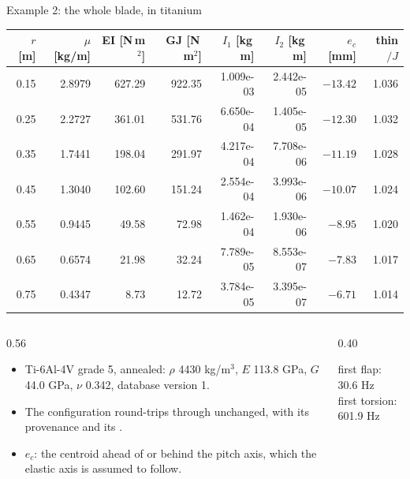 \begin{frame}{Example 2: the whole blade, in titanium}
\relax %
{\ftstablesize\renewcommand{\arraystretch}{1.1}
\begin{tabular*}{\linewidth}{@{\extracolsep{\fill}}rrrrrrrr@{}}
\toprule
\(r\) [m] & \(\mu\) [kg/m] & EI [N\,m\(^2\)] & GJ [N\,m\(^2\)] & \(I_1\) [kg\,m] & \(I_2\) [kg\,m] & \(e_c\) [mm] & thin\(/J\) \\
\midrule
0.15 & 2.8979 & 627.29 & 922.35 & 1.009e-03 & 2.442e-05 & \(-13.42\) & 1.036 \\
0.25 & 2.2727 & 361.01 & 531.76 & 6.650e-04 & 1.405e-05 & \(-12.30\) & 1.032 \\
0.35 & 1.7441 & 198.04 & 291.97 & 4.217e-04 & 7.708e-06 & \(-11.19\) & 1.028 \\
0.45 & 1.3040 & 102.60 & 151.24 & 2.554e-04 & 3.993e-06 & \(-10.07\) & 1.024 \\
0.55 & 0.9445 & 49.58 & 72.98 & 1.462e-04 & 1.930e-06 & \(-8.95\) & 1.020 \\
0.65 & 0.6574 & 21.98 & 32.24 & 7.789e-05 & 8.553e-07 & \(-7.83\) & 1.017 \\
0.75 & 0.4347 & 8.73 & 12.72 & 3.784e-05 & 3.395e-07 & \(-6.71\) & 1.014 \\
\bottomrule
\end{tabular*}}
\par\vspace{2mm}
\begin{columns}[T]
\begin{column}{0.56\textwidth}
\begin{itemize}\scriptsize
  \item Ti-6Al-4V grade 5, annealed: \(\rho\) 4430 kg/m\(^3\), \(E\) 113.8 GPa,
        \(G\) 44.0 GPa, \(\nu\) 0.342, database version 1.
  \item The configuration round-trips through  unchanged,
        with its provenance and its .
  \item \(e_c\): the centroid ahead of or behind the pitch axis, which the
        elastic axis is assumed to follow.
\end{itemize}
\end{column}
\begin{column}{0.40\textwidth}
\begin{ftsevidence}
\small first flap: 30.6 Hz\\
first torsion: 601.9 Hz
\end{ftsevidence}
\end{column}
\end{columns}
\end{frame}

